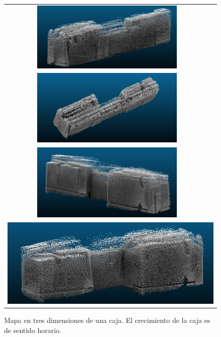 \begin{figure}%
    \centering
    \begin{tabular}{cc}
      \includegraphics[width=0.70\textwidth]{images/3DSotano1.png}\\
      \includegraphics[width=0.70\textwidth]{images/holi.png}\\
      \includegraphics[width=0.70\textwidth]{images/3DSotano3.png}\\
      \multicolumn{2}{c}{\includegraphics[width=0.70\linewidth]{images/3DSotano4.png}}\\
    \end{tabular}
  \captionsetup{font=footnotesize}
    \caption{\label{fig:tunel2013D}Mapa en tres dimensiones de una caja. El crecimiento de la caja es de sentido horario.}
\end{figure} 

